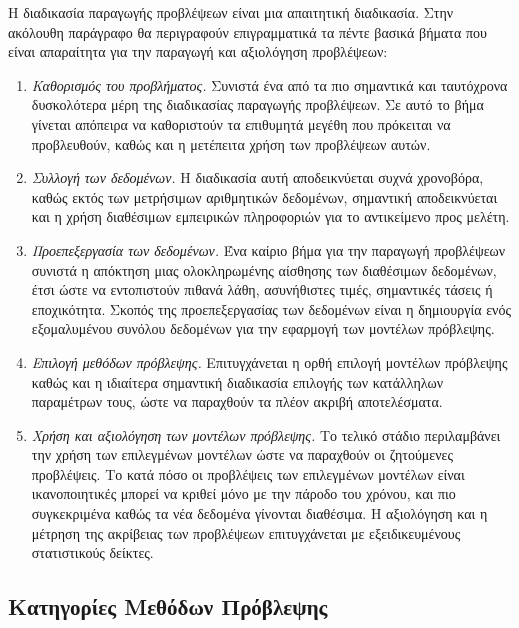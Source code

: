 \documentclass[diploma]{softlab-thesis}
\begin{document}
Η διαδικασία παραγωγής προβλέψεων είναι μια απαιτητική διαδικασία. Στην ακόλουθη παράγραφο θα περιγραφούν επιγραμματικά τα πέντε βασικά βήματα που είναι απαραίτητα για την παραγωγή και αξιολόγηση προβλέψεων:

\begin{enumerate}
    \item \textit{Καθορισμός του προβλήματος.} Συνιστά ένα από τα πιο σημαντικά και ταυτόχρονα δυσκολότερα μέρη της διαδικασίας παραγωγής προβλέψεων. Σε αυτό το βήμα γίνεται απόπειρα να καθοριστούν τα επιθυμητά μεγέθη που πρόκειται να προβλευθούν, καθώς και η μετέπειτα χρήση των προβλέψεων αυτών.
    \item \textit{Συλλογή των δεδομένων.} Η διαδικασία αυτή αποδεικνύεται συχνά χρονοβόρα, καθώς εκτός των μετρήσιμων αριθμητικών δεδομένων, σημαντική αποδεικνύεται και η χρήση διαθέσιμων εμπειρικών πληροφοριών για το αντικείμενο προς μελέτη. 
    \item \textit{Προεπεξεργασία των δεδομένων.} Ένα καίριο βήμα για την παραγωγή προβλέψεων συνιστά η απόκτηση μιας ολοκληρωμένης αίσθησης των διαθέσιμων δεδομένων, έτσι ώστε να εντοπιστούν πιθανά λάθη, ασυνήθιστες τιμές, σημαντικές τάσεις ή εποχικότητα. Σκοπός της προεπεξεργασίας των δεδομένων είναι η δημιουργία ενός εξομαλυμένου συνόλου δεδομένων για την εφαρμογή των μοντέλων πρόβλεψης.
     \item \textit{Επιλογή μεθόδων πρόβλεψης.} Επιτυγχάνεται η ορθή επιλογή μοντέλων πρόβλεψης καθώς και η ιδιαίτερα σημαντική διαδικασία επιλογής των κατάλληλων παραμέτρων τους, ώστε να παραχθούν τα πλέον ακριβή αποτελέσματα. 
      \item \textit{Χρήση και αξιολόγηση των μοντέλων πρόβλεψης.} Το τελικό στάδιο περιλαμβάνει την χρήση των επιλεγμένων μοντέλων ώστε να παραχθούν οι ζητούμενες προβλέψεις. Το κατά πόσο οι προβλέψεις των επιλεγμένων μοντέλων είναι ικανοποιητικές μπορεί να κριθεί μόνο με την πάροδο του χρόνου, και πιο συγκεκριμένα καθώς τα νέα δεδομένα γίνονται διαθέσιμα. Η αξιολόγηση και η μέτρηση της ακρίβειας των προβλέψεων επιτυγχάνεται με εξειδικευμένους στατιστικούς δείκτες.
\end{enumerate}

\subsection{Κατηγορίες Μεθόδων Πρόβλεψης}
\end{document}
